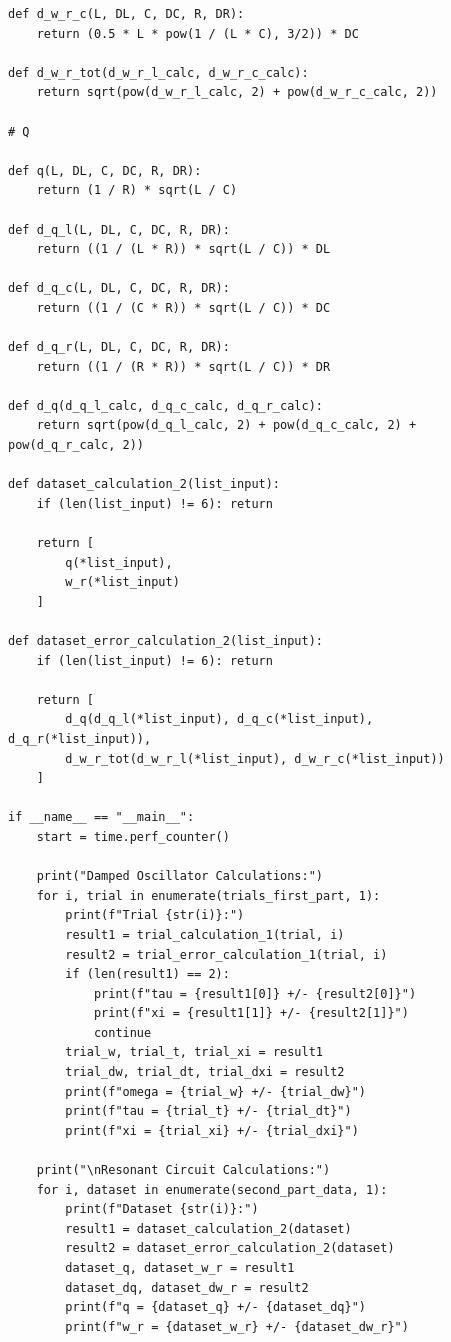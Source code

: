 \documentclass[12pt]{article}
\begin{document}
\begin{verbatim}
def d_w_r_c(L, DL, C, DC, R, DR):
    return (0.5 * L * pow(1 / (L * C), 3/2)) * DC

def d_w_r_tot(d_w_r_l_calc, d_w_r_c_calc):
    return sqrt(pow(d_w_r_l_calc, 2) + pow(d_w_r_c_calc, 2))

# Q

def q(L, DL, C, DC, R, DR):
    return (1 / R) * sqrt(L / C)

def d_q_l(L, DL, C, DC, R, DR):
    return ((1 / (L * R)) * sqrt(L / C)) * DL

def d_q_c(L, DL, C, DC, R, DR):
    return ((1 / (C * R)) * sqrt(L / C)) * DC

def d_q_r(L, DL, C, DC, R, DR):
    return ((1 / (R * R)) * sqrt(L / C)) * DR

def d_q(d_q_l_calc, d_q_c_calc, d_q_r_calc):
    return sqrt(pow(d_q_l_calc, 2) + pow(d_q_c_calc, 2) + pow(d_q_r_calc, 2))

def dataset_calculation_2(list_input):
    if (len(list_input) != 6): return
    
    return [
        q(*list_input),
        w_r(*list_input)
    ]
    
def dataset_error_calculation_2(list_input):
    if (len(list_input) != 6): return
    
    return [
        d_q(d_q_l(*list_input), d_q_c(*list_input), d_q_r(*list_input)),
        d_w_r_tot(d_w_r_l(*list_input), d_w_r_c(*list_input))
    ]

if __name__ == "__main__":
    start = time.perf_counter()
    
    print("Damped Oscillator Calculations:")
    for i, trial in enumerate(trials_first_part, 1):
        print(f"Trial {str(i)}:")
        result1 = trial_calculation_1(trial, i)
        result2 = trial_error_calculation_1(trial, i)
        if (len(result1) == 2):
            print(f"tau = {result1[0]} +/- {result2[0]}")
            print(f"xi = {result1[1]} +/- {result2[1]}")
            continue
        trial_w, trial_t, trial_xi = result1
        trial_dw, trial_dt, trial_dxi = result2
        print(f"omega = {trial_w} +/- {trial_dw}")
        print(f"tau = {trial_t} +/- {trial_dt}")
        print(f"xi = {trial_xi} +/- {trial_dxi}")
        
    print("\nResonant Circuit Calculations:")
    for i, dataset in enumerate(second_part_data, 1):
        print(f"Dataset {str(i)}:")
        result1 = dataset_calculation_2(dataset)
        result2 = dataset_error_calculation_2(dataset)
        dataset_q, dataset_w_r = result1
        dataset_dq, dataset_dw_r = result2
        print(f"q = {dataset_q} +/- {dataset_dq}")
        print(f"w_r = {dataset_w_r} +/- {dataset_dw_r}")
        

\end{verbatim}
\end{document}
